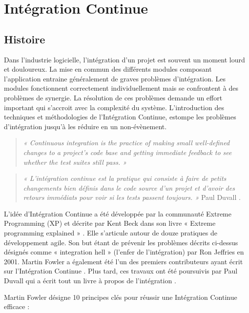 \chapter{Intégration Continue} \label{ContinousIntegration}

  \section{Histoire}
  Dans l’industrie logicielle, l’intégration d’un projet est souvent un moment lourd et douloureux. La mise en commun des différents modules composant l’application entraine généralement de graves problèmes d’intégration. Les modules fonctionnent correctement individuellement mais se confrontent à des problèmes de synergie. La résolution de ces problèmes demande un effort important qui s’accroit avec la complexité du système. L’introduction des techniques et méthodologies de l’Intégration Continue, estompe les problèmes d’intégration jusqu’à les réduire en un non-évènement.\\

  \begin{quotation}
    \emph{« Continuous integration is the practice of making small well-defined changes to a project’s code base and getting immediate feedback to see whether the test suites still pass. »}
  \end{quotation}

  \begin{quotation}
    \emph{« L'intégration continue est la pratique qui consiste à faire de petits changements bien définis dans le code source d'un projet et d'avoir des retours immédiats pour voir  si les tests passent toujours. »} Paul Duvall \cite{Duv07}.\\
  \end{quotation}

  L’idée d'Intégration Continue a été développée par la communauté Extreme Programming (XP) et décrite par Kent Beck dans son livre « Extreme programming explained » \cite{Bec99}. Elle s'articule autour de douze pratiques de développement agile. Son but étant de prévenir les problèmes décrits ci-dessus désignés comme « integration hell » (l’enfer de l’intégration) par Ron Jeffries en 2001. Martin Fowler a également été l'un des premiers contributeurs ayant écrit sur l’Intégration Continue \cite{Fow00}. Plus tard, ces travaux ont été poursuivis par Paul Duvall qui a écrit tout un livre à propos de l’intégration \cite{Duv07}.

  Martin Fowler \cite{Fow00} désigne 10 principes clés pour réussir une Intégration Continue efficace :\\

